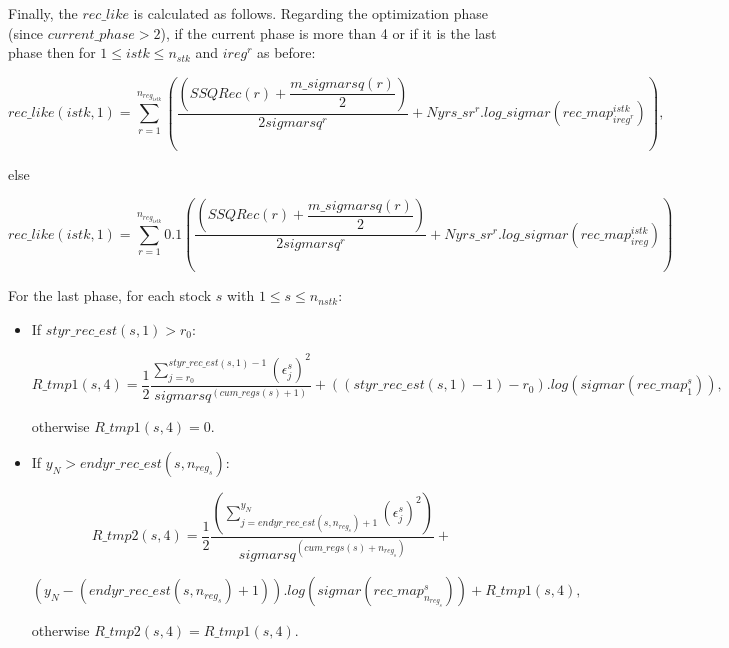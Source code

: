 \documentclass{article}
\begin{document}
Finally, the $rec\_like$ is calculated as follows. Regarding the optimization phase (since $current\_phase > 2$), if the current phase is more than 4 or if it is the last phase then for $1\leq istk \leq n_{stk}$ and $ireg^r$ as before:

\begin{equation}
    rec\_like(istk,1)= \sum_{r=1}^{n_{reg_{istk}}}\left(\dfrac{\left(SSQRec(r)+ \dfrac{m\_sigmarsq(r)}{2}\right)}{2 sigmarsq^r} + Nyrs\_sr^r .log\_sigmar(rec\_map^{istk}_{ireg^r})\right),
\end{equation}

else 

\begin{equation}
    rec\_like(istk,1)=\sum_{r=1}^{n_{reg_{istk}}}0.1 \left(\dfrac{\left(SSQRec(r)+ \dfrac{m\_sigmarsq(r)}{2}\right)}{2 sigmarsq^r} + Nyrs\_sr^r .log\_sigmar(rec\_map^{istk}_{ireg})\right)
\end{equation}

For the last phase, for each stock $s$ with $1\leq s \leq n_{nstk}$:

\begin{itemize}
    
    \item If $styr\_rec\_est(s,1)>r_0$:
    
    \begin{equation}
        R\_tmp1(s,4) = \dfrac{1}{2}\dfrac{\displaystyle\sum_{j=r_0}^{styr\_rec\_est(s,1)-1}(\epsilon^s_j)^2}{sigmarsq^{(cum\_regs(s)+1)}} + ((styr\_rec\_est(s,1)-1)-r_0) .log(sigmar(rec\_map^s_1)),
    \end{equation}
          
    otherwise $R\_tmp1(s,4)=0$.
    
    \item If $y_N > endyr\_rec\_est(s,n_{reg_s})$:
    
    \begin{equation}
        R\_tmp2(s,4) =  \dfrac{1}{2}\dfrac{\displaystyle\left(\sum_{j=endyr\_rec\_est(s,n_{reg_s})+1}^{y_N}(\epsilon^s_j )^2\right)}{sigmarsq^{(cum\_regs(s)+n_{reg_s})}} + 
    \end{equation}
    
    \begin{equation*}
        (y_N-(endyr\_rec\_est(s,n_{reg_s})+1)). log(sigmar(rec\_map^s_{n_{reg_s}})) + R\_tmp1(s,4),
    \end{equation*}
    
    otherwise %
    $R\_tmp2(s,4)=R\_tmp1(s,4)$.
    
\end{itemize}
\end{document}
